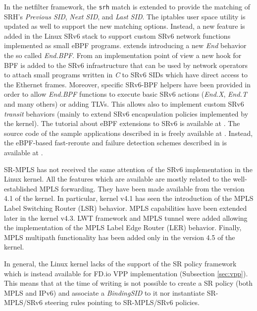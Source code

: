 In the netfilter framework, the \texttt{srh} match is extended to provide the matching of SRH's \textit{Previous SID}, \textit{Next SID}, and \textit{Last SID}. The iptables user space utility is updated as well to support the new matching options. Instead, a new feature is added in the Linux SRv6 stack to support custom SRv6 network functions implemented as small eBPF \cite{lwn-ebpf} programs. \cite{xhonneux2018leveraging} extends \cite{id-srv6-network-prog} introducing a new \textit{End} behavior the so called \textit{End.BPF}. From an implementation point of view a new hook for BPF is added to the SRv6 infrastructure that can be used by network operators to attach small programs written in \textit{C} to SRv6 SIDs which have direct access to the Ethernet frames. Moreover, specific SRv6-BPF helpers have been provided in order to allow \textit{End.BPF} functions to execute basic SRv6 actions (\textit{End.X}, \textit{End.T} and many others) or adding TLVs. This allows also to implement custom SRv6 \textit{transit} behaviors (mainly to extend SRv6 encapsulation policies implemented by the kernel). The tutorial about eBPF extensions to SRv6 is available at \cite{srv6-ebpf-tutorial}. The source code of the sample applications described in \cite{xhonneux2018leveraging} is freely available at \cite{srv6-ebpf-code1}. Instead, the eBPF-based fast-reroute and failure detection schemes described in \cite{xhonneux2018flexible} is available at \cite{srv6-ebpf-code2}.

SR-MPLS has not received the same attention of the SRv6 implementation in the Linux kernel. All the features which are available are mostly related to the well-established MPLS forwarding. They have been made available from the version 4.1 of the kernel. In particular, kernel v4.1 has seen the introduction of the MPLS Label Switching Router (LSR) behavior. MPLS capabilities have been extended later in the kernel v4.3. LWT framework and MPLS tunnel were added allowing the implementation of the MPLS Label Edge Router (LER) behavior. Finally, MPLS multipath functionality has been added only in the version 4.5 of the kernel.

In general, the Linux kernel lacks of the support of the SR policy framework which is instead available for FD.io VPP implementation (Subsection \ref{sec:vpp}). This means that at the time of writing is not possible to create a SR policy (both MPLS and IPv6) and associate a \textit{BindingSID} to it nor instantiate SR-MPLS/SRv6 steering rules pointing to SR-MPLS/SRv6 policies.


